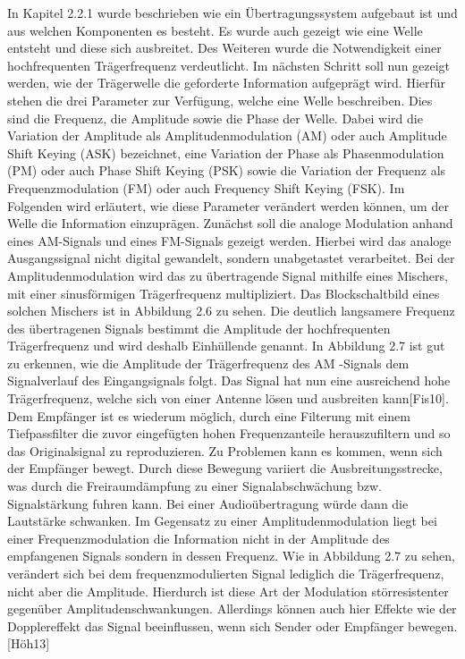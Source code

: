 In Kapitel 2.2.1 wurde beschrieben wie ein Übertragungssystem aufgebaut ist und aus welchen Komponenten es besteht. Es wurde auch gezeigt wie eine Welle entsteht und diese sich ausbreitet. Des Weiteren wurde die Notwendigkeit einer hochfrequenten Trägerfrequenz verdeutlicht. Im nächsten Schritt soll nun gezeigt werden, wie der Trägerwelle die geforderte Information aufgeprägt wird. Hierfür stehen die drei Parameter zur Verfügung, welche eine Welle beschreiben. Dies sind die Frequenz, die Amplitude sowie die Phase der Welle. Dabei wird die Variation der Amplitude als Amplitudenmodulation (AM) oder auch
Amplitude Shift Keying (ASK) bezeichnet, eine Variation der Phase als Phasenmodulation
(PM) oder auch Phase Shift Keying (PSK) sowie die Variation der Frequenz als Frequenzmodulation (FM) oder auch Frequency Shift Keying (FSK). Im Folgenden wird erläutert,
wie diese Parameter verändert werden können, um der Welle die Information einzuprägen.
Zunächst soll die analoge Modulation anhand eines AM-Signals und eines FM-Signals gezeigt werden. Hierbei wird das analoge Ausgangssignal nicht digital gewandelt, sondern
unabgetastet verarbeitet. Bei der Amplitudenmodulation wird das zu übertragende Signal mithilfe eines Mischers, mit einer sinusförmigen Trägerfrequenz multipliziert. Das Blockschaltbild eines solchen Mischers ist in Abbildung 2.6 zu sehen.
Die deutlich langsamere Frequenz des übertragenen Signals bestimmt die Amplitude der hochfrequenten Trägerfrequenz und wird deshalb Einhüllende genannt. In Abbildung 2.7 ist gut zu erkennen, wie die Amplitude der Trägerfrequenz des AM -Signals dem Signalverlauf des Eingangsignals folgt. Das Signal hat nun eine ausreichend hohe Trägerfrequenz, welche sich von einer Antenne lösen und ausbreiten kann[Fis10]. Dem Empfänger ist es wiederum möglich, durch eine Filterung mit einem Tiefpassfilter die zuvor eingefügten hohen Frequenzanteile herauszufiltern und so das Originalsignal zu reproduzieren. Zu Problemen kann es kommen, wenn sich der Empfänger bewegt. Durch diese Bewegung variiert
die Ausbreitungsstrecke, was durch die Freiraumdämpfung zu einer Signalabschwächung
bzw. Signalstärkung fuhren kann. Bei einer Audioübertragung würde dann die Lautstärke schwanken. Im Gegensatz zu einer Amplitudenmodulation liegt bei einer Frequenzmodulation die Information nicht in der Amplitude des empfangenen Signals sondern in dessen Frequenz. Wie in Abbildung 2.7 zu sehen, verändert sich bei dem frequenzmodulierten Signal lediglich die Trägerfrequenz, nicht aber die Amplitude. Hierdurch ist diese Art der Modulation störresistenter gegenüber Amplitudenschwankungen. Allerdings können auch hier Effekte wie der Dopplereffekt das Signal beeinflussen, wenn sich Sender oder Empfänger bewegen.[Höh13]


